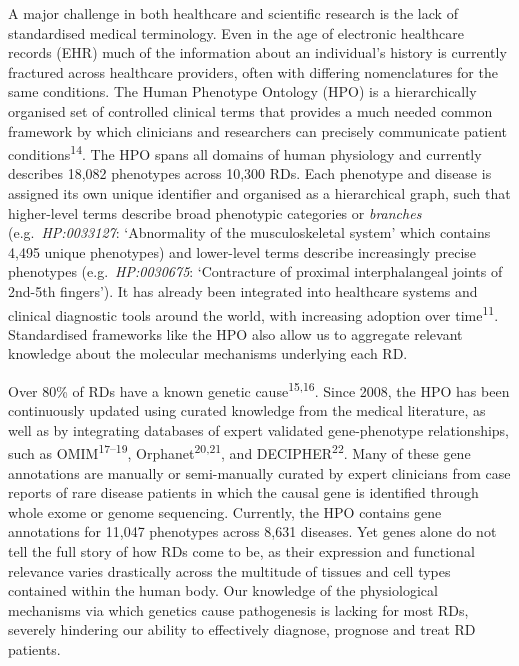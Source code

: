\documentclass[
]{article}
\begin{document}
A major challenge in both healthcare and scientific research is the lack
of standardised medical terminology. Even in the age of electronic
healthcare records (EHR) much of the information about an individual's
history is currently fractured across healthcare providers, often with
differing nomenclatures for the same conditions. The Human Phenotype
Ontology (HPO) is a hierarchically organised set of controlled clinical
terms that provides a much needed common framework by which clinicians
and researchers can precisely communicate patient
conditions\textsuperscript{14}. The HPO spans all domains of human
physiology and currently describes 18,082 phenotypes across 10,300 RDs.
Each phenotype and disease is assigned its own unique identifier and
organised as a hierarchical graph, such that higher-level terms describe
broad phenotypic categories or \emph{branches} (e.g.~\emph{HP:0033127}:
`Abnormality of the musculoskeletal system' which contains 4,495 unique
phenotypes) and lower-level terms describe increasingly precise
phenotypes (e.g.~\emph{HP:0030675}: `Contracture of proximal
interphalangeal joints of 2nd-5th fingers'). It has already been
integrated into healthcare systems and clinical diagnostic tools around
the world, with increasing adoption over time\textsuperscript{11}.
Standardised frameworks like the HPO also allow us to aggregate relevant
knowledge about the molecular mechanisms underlying each RD.

Over 80\% of RDs have a known genetic cause\textsuperscript{15,16}.
Since 2008, the HPO has been continuously updated using curated
knowledge from the medical literature, as well as by integrating
databases of expert validated gene-phenotype relationships, such as
OMIM\textsuperscript{17--19}, Orphanet\textsuperscript{20,21}, and
DECIPHER\textsuperscript{22}. Many of these gene annotations are
manually or semi-manually curated by expert clinicians from case reports
of rare disease patients in which the causal gene is identified through
whole exome or genome sequencing. Currently, the HPO contains gene
annotations for 11,047 phenotypes across 8,631 diseases. Yet genes alone
do not tell the full story of how RDs come to be, as their expression
and functional relevance varies drastically across the multitude of
tissues and cell types contained within the human body. Our knowledge of
the physiological mechanisms via which genetics cause pathogenesis is
lacking for most RDs, severely hindering our ability to effectively
diagnose, prognose and treat RD patients.
\end{document}
